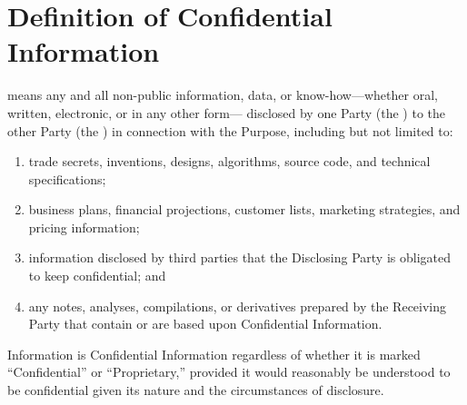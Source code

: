 \section{Definition of Confidential Information}

\noindent
{} means any and all non-public information,
data, or know-how—whether oral, written, electronic, or in any other form—
disclosed by one Party (the ) to the other Party
(the ) in connection with the Purpose, including but
not limited to:

\begin{enumerate}
  \item trade secrets, inventions, designs, algorithms, source code, and
        technical specifications;
  \item business plans, financial projections, customer lists, marketing
        strategies, and pricing information;
  \item information disclosed by third parties that the Disclosing Party
        is obligated to keep confidential; and
  \item any notes, analyses, compilations, or derivatives prepared by the
        Receiving Party that contain or are based upon Confidential Information.
\end{enumerate}

\noindent
Information is Confidential Information regardless of whether it is marked
``Confidential'' or ``Proprietary,'' provided it would reasonably be
understood to be confidential given its nature and the circumstances of
disclosure.
